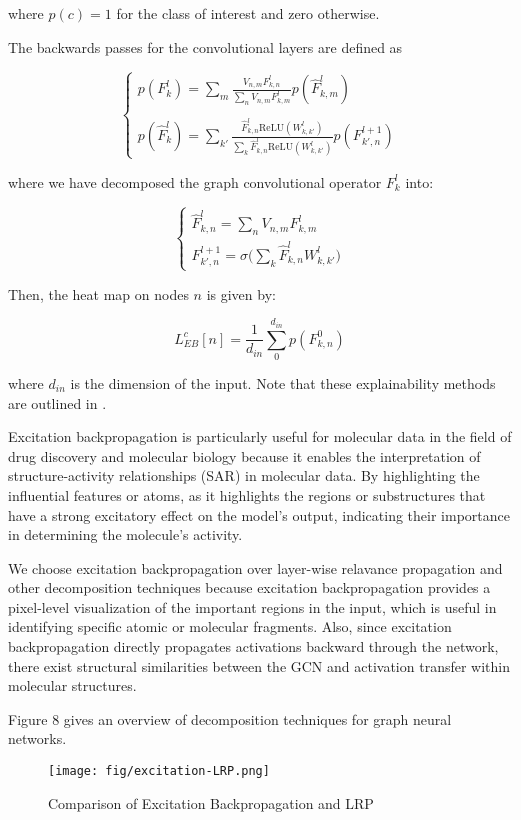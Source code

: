 \documentclass[final]{article}
\begin{document}
where $p(c) = 1$ for the class of interest and zero otherwise. 

The backwards passes for the convolutional layers are defined as 

$$\begin{cases}
    \displaystyle p(F_k^l)= \sum_m\frac{V_{n, m}F^l_{k, n}}{\sum_n V_{n, m}F^l_{k, m}}p(\hat{F}_{k, m}^l) \\
    \\
    \displaystyle p(\hat{F}_k^l) = \sum_{k'}\frac{\hat{F}_{k, n}^l\text{ReLU}(W^l_{k, k'})}{\sum_k \hat{F}_{k, n}^l\text{ReLU}(W^l_{k, k'})}p(F^{l+1}_{k', n})
\end{cases}$$

where we have decomposed the graph convolutional operator $F_k^l$ into: 

$$\begin{cases}
    \hat{F}^l_{k, n} = \sum_n V_{n, m}F^l_{k, m} \\
    \displaystyle F^{l+1}_{k', n} = \sigma \bigg( \sum_k \hat{F}^l_{k, n} W^l_{k, k'}\bigg) 
\end{cases}$$

Then, the heat map on nodes $n$ is given by: 

$$L_{EB}^c[n] = \frac{1}{d_{in}}\sum_0^{d_{in}} p(F^0_{k, n})$$

where $d_{in}$ is the dimension of the input. Note that these explainability methods are outlined in \cite{8954227}. 

Excitation backpropagation is particularly useful for molecular data in the field of drug discovery and molecular biology because it enables the interpretation of structure-activity relationships (SAR) in molecular data. By highlighting the influential features or atoms, as it highlights the regions or substructures that have a strong excitatory effect on the model's output, indicating their importance in determining the molecule's activity. \cite{zhang2016topdown}

We choose excitation backpropagation over layer-wise relavance propagation and other decomposition techniques because excitation backpropagation provides a pixel-level visualization of the important regions in the input, which is useful in identifying specific atomic or molecular fragments. Also, since excitation backpropagation directly propagates activations backward through the network, there exist structural similarities between the GCN and activation transfer within molecular structures. \cite{Dai2023}

Figure 8 gives an overview of decomposition techniques for graph neural networks. 
\newpage
\begin{figure}[!hbt]
  \centering
 \texttt{[image: fig/excitation-LRP.png]}
  \caption{Comparison of Excitation Backpropagation and LRP}
 \end{figure} 
 
\end{document}
